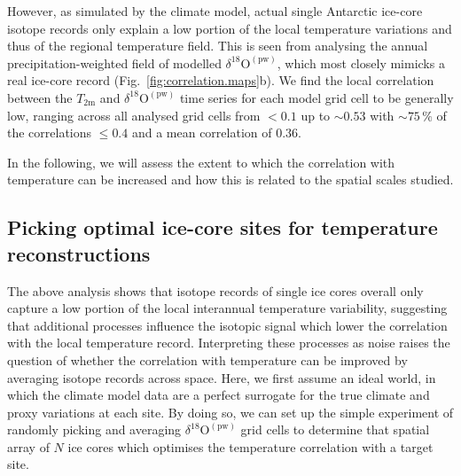 \documentclass[cp, manuscript, draft]{copernicus}
\begin{document}
However, as simulated by the climate model, actual single Antarctic ice-core
isotope records only explain a low portion of the local temperature variations
and thus of the regional temperature field. This is seen from analysing the
annual precipitation-weighted field of modelled
$\delta^{18}\mathrm{O}^{\mathrm{(pw)}}$, which most closely mimicks a real
ice-core record (Fig.~\ref{fig:correlation.maps}b). We find the local
correlation between the $T_{2\mathrm{m}}$ and
$\delta^{18}\mathrm{O}^{\mathrm{(pw)}}$ time series for each model grid cell to
be generally low, ranging across all analysed grid cells from $<0.1$ up to
$\sim0.53$ with $\sim75\,\%$ of the correlations $\leq0.4$ and a mean
correlation of $0.36$.

In the following, we will assess the extent to which the correlation with
temperature can be increased and how this is related to the spatial scales
studied.

\subsection{Picking optimal ice-core sites for temperature reconstructions}
\label{results:picking}

The above analysis shows that isotope records of single ice cores overall only
capture a low portion of the local interannual temperature variability,
suggesting that additional processes influence the isotopic signal which lower
the correlation with the local temperature record. Interpreting these processes
as noise raises the question of whether the correlation with temperature can be
improved by averaging isotope records across space. Here, we first assume an
ideal world, in which the climate model data are a perfect surrogate for the
true climate and proxy variations at each site. By doing so, we can set up the
simple experiment of randomly picking and averaging
$\delta^{18}\mathrm{O}^{\mathrm{(pw)}}$ grid cells to determine that spatial
array of $N$ ice cores which optimises the temperature correlation with a target
site.
\end{document}
